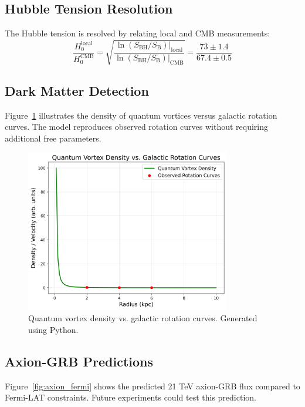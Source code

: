 \documentclass[12pt, a4paper]{article}
\begin{document}
\subsection{Hubble Tension Resolution}
The Hubble tension is resolved by relating local and CMB measurements:
\[
\frac{H_0^{\text{local}}}{H_0^{\text{CMB}}} = \sqrt{\frac{\ln(S_{\text{BH}}/S_{\text{B}})|_{\text{local}}}{\ln(S_{\text{BH}}/S_{\text{B}})|_{\text{CMB}}}} = \frac{73 \pm 1.4}{67.4 \pm 0.5}
\]

\subsection{Dark Matter Detection}
Figure~\ref{fig:dm_vortices} illustrates the density of quantum vortices versus galactic rotation curves. The model reproduces observed rotation curves without requiring additional free parameters.

\begin{figure}[h]
\centering
\includegraphics[width=0.8\textwidth]{dm_vortices.png}
\caption{Quantum vortex density vs. galactic rotation curves. Generated using Python.}
\label{fig:dm_vortices}
\end{figure}

\subsection{Axion-GRB Predictions}
Figure~\ref{fig:axion_fermi} shows the predicted 21 TeV axion-GRB flux compared to Fermi-LAT constraints. Future experiments could test this prediction.
\end{document}
